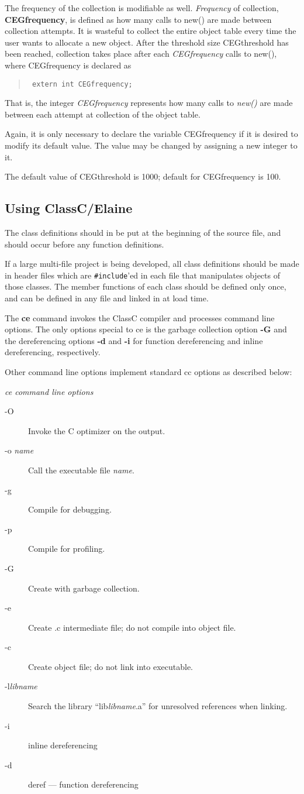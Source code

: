 The frequency of the collection is modifiable as well.
{\em Frequency}
of collection,
{\bf CEGfrequency},
is defined as how many calls to
new()
are made between collection attempts.  It is wasteful to
collect the entire object table every time the user wants to allocate a new
object.  After the threshold size
CEGthreshold
has been reached, collection takes place
after each {\em CEGfrequency} calls to new(), where CEGfrequency is declared as
\begin{quote} \tt
extern int CEGfrequency;
\end{quote}
That is, the integer
{\em CEGfrequency}
represents how many calls to
{\em new()}
are made between each attempt at collection of the object table.

Again, it is only necessary to declare the variable CEGfrequency
if it is desired to
modify its default value.  The value may be changed by assigning a
new integer to it.

The default value of CEGthreshold is 1000; default for CEGfrequency is 100.

\subsection{Using ClassC/Elaine}
The class definitions should in be put at the beginning of the source
file, and should occur before any function definitions.

If a large multi-file project is being developed, all class definitions
should be made in header files which are
{\tt \#include}'ed
in each file that manipulates objects of those classes.  The member
functions of each class should be defined only once, and
can be defined in any file and linked in at
load time.

The
{\bf ce}
command invokes the ClassC compiler and processes command line options.
The only options special to
ce
is the garbage collection option {\bf -G} and the dereferencing options
{\bf -d} and {\bf -i} for function dereferencing and inline dereferencing,
respectively.

Other command line options implement standard cc options as described below:


{\em ce command line options}
\begin{description}
\item[-O]
Invoke the C optimizer on the output.
\item[-o {\em name}]
Call the executable file {\em name}.
\item[-g]
Compile for debugging.
\item[-p]
Compile for profiling.
\item[-G]
Create with garbage collection.
\item[-e]
Create .c intermediate file; do not compile into object file.
\item[-c]
Create object file; do not link into executable.
\item[-l{\em libname}]
Search the library ``lib{\em libname}.a'' for unresolved references
when linking.
\item[-i] inline dereferencing
\item[-d] deref --- function dereferencing
\end{description}

